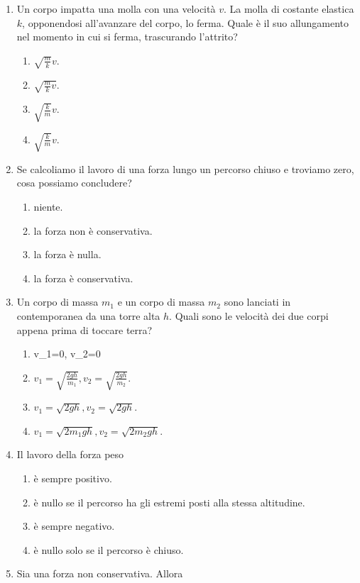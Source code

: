 \documentclass{article}
\begin{document}
\begin{enumerate}
  \item Un corpo impatta una molla con una velocità $v$. La molla di costante elastica $k$, opponendosi all'avanzare del corpo, lo ferma. Quale è il suo allungamento nel momento in cui si ferma, trascurando l'attrito?
  \begin{enumerate}[label=\Alph*.]
    \item $\sqrt{\frac{m}{k}}v$.
    \item $\sqrt{\frac{m}{k}v}$.
    \item $\sqrt{\frac{k}{m}}v$.
    \item $\sqrt{\frac{k}{m}}v$.
  \end{enumerate}
  \item Se calcoliamo il lavoro di una forza lungo un percorso chiuso e troviamo zero, cosa possiamo concludere?
  \begin{enumerate}[label=\Alph*.]
    \item niente.
    \item la forza non è conservativa.
    \item la forza è nulla.
    \item la forza è conservativa.
  \end{enumerate}
  \item Un corpo di massa $m_1$ e un corpo di massa $m_2$ sono lanciati in contemporanea da una torre alta $h$. Quali sono le velocità dei due corpi appena prima di toccare terra?
  \begin{enumerate}[label=\Alph*.]
    \item v_1=0, v_2=0
    \item $v_1=\sqrt{\frac{2gh}{m_1}}, v_2=\sqrt{\frac{2gh}{m_2}}$.
    \item $v_1=\sqrt{2gh}, v_2=\sqrt{2gh}$.
    \item $v_1=\sqrt{2m_1gh}, v_2=\sqrt{2m_2gh}$.
  \end{enumerate}
  \item Il lavoro della forza peso
  \begin{enumerate}[label=\Alph*.]
    \item è sempre positivo.
    \item è nullo se il percorso ha gli estremi posti alla stessa altitudine.
    \item è sempre negativo.
    \item è nullo solo se il percorso è chiuso.
  \end{enumerate}
  \item Sia  una forza non conservativa. Allora

\end{enumerate}
\end{document}
